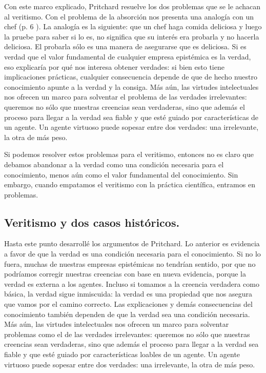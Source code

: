 \documentclass{article}
\begin{document}
Con este marco explicado, Pritchard resuelve los dos problemas que se le achacan al veritismo. Con el problema de la absorción nos presenta una analogía con un chef (p. 6 ). La analogía es la siguiente: que un chef haga comida deliciosa y luego la pruebe para saber si lo es, no significa que su interés era probarla y no hacerla deliciosa. El probarla sólo es una manera de asegurarse que es deliciosa. Si es verdad que el valor fundamental de cualquier empresa epistémica es la verdad, eso explicaría por qué nos interesa obtener verdades: si bien esto tiene implicaciones prácticas, cualquier consecuencia depende de que de hecho nuestro conocimiento apunte a la verdad y la consiga. Más aún, las virtudes intelectuales nos ofrecen un marco para solventar el problema de las verdades irrelevantes: queremos no sólo que nuestras creencias sean verdaderas, sino que además el proceso para llegar a la verdad sea fiable y que esté guiado por características de un agente. Un agente virtuoso puede sopesar entre dos verdades: una irrelevante, la otra de más peso.

Si podemos resolver estos problemas para el veritismo, entonces no es claro que debamos abandonar a la verdad como una condición necesaria para el conocimiento, menos aún como el valor fundamental del conocimiento. Sin embargo, cuando empatamos el veritismo con la práctica científica, entramos en problemas.

\subsection{Veritismo y dos casos históricos.}

\noindent Hasta este punto desarrollé los argumentos de Pritchard. Lo anterior es evidencia a favor de que la verdad es una condición necesaria para el conocimiento. Si no lo fuera, muchas de nuestras empresas epistémicas no tendrían sentido, por que no podríamos corregir nuestras creencias con base en nueva evidencia, porque la verdad es externa a los agentes. Incluso si tomamos a la creencia verdadera como básica, la verdad sigue inmiscuida: la verdad es una propiedad que nos asegura que vamos por el camino correcto. Las explicaciones y demás consecuencias del conocimiento también dependen de que la verdad sea una condición necesaria. Más aún, las virtudes intelectuales nos ofrecen un marco para solventar problemas como el de las verdades irrelevantes: queremos no sólo que nuestras creencias sean verdaderas, sino que además el proceso para llegar a la verdad sea fiable y que esté guiado por características loables de un agente. Un agente virtuoso puede sopesar entre dos verdades: una irrelevante, la otra de más peso.
\end{document}
